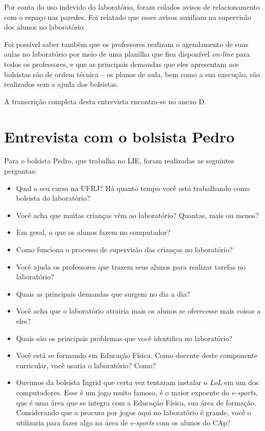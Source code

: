Por conta do uso indevido do laboratório, foram colados avisos de relacionamento com o espaço nas paredes. Foi relatado que esses avisos auxiliam na supervisão dos alunos no laboratório.

Foi possível saber também que os professores realizam o agendamento de suas aulas no laboratório por meio de uma planilha que fica disponível \textit{on-line} para todos os professores, e que as principais demandas que eles apresentam aos bolsistas são de ordem técnica -- os planos de aula, bem como a sua execução, são realizados sem a ajuda dos bolsistas.

A transcrição completa desta entrevista encontra-se no anexo D.

\section{Entrevista com o bolsista Pedro}\label{chp:LABEL_CHP_ENT_SEC_PED}

Para o bolsista Pedro, que trabalha no LIE, foram realizadas as seguintes perguntas:

\begin{itemize}
\item{Qual o seu curso na UFRJ? Há quanto tempo você está trabalhando como bolsista do laboratório?}
\item{Você acha que muitas crianças vêm ao laboratório? Quantas, mais ou menos?}
\item{Em geral, o que os alunos fazem no computador?}
\item{Como funciona o processo de supervisão das crianças no laboratório?}
\item{Você ajuda os professores que trazem seus alunos para realizar tarefas no laboratório?}
\item{Quais as principais demandas que surgem no dia a dia?}
\item{Você acha que o laboratório atrairia mais os alunos se oferecesse mais coisas a eles?}
\item{Quais são os principais problemas que você identifica no laboratório?}
\item{Você está se formando em Educação Física. Como docente deste componente curricular, você usaria o laboratório? Como?}
\item{Ouvimos da bolsista Ingrid que certa vez tentaram instalar o \textit{LoL} em um dos computadores. Esse é um jogo muito famoso, é o maior expoente do \textit{e-sports}, que é uma área que se integra com a Educação Física, sua área de formação. Considerando que a procura por jogos aqui no laboratório é grande, você o utilizaria para fazer algo na área de \textit{e-sports} com os alunos do CAp?}
\end{itemize}

